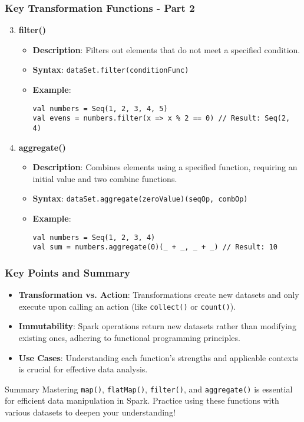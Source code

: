 \documentclass[aspectratio=169]{beamer}
\begin{document}
\begin{frame}[fragile]
    \frametitle{Key Transformation Functions - Part 2}
    \begin{enumerate}
        \setcounter{enumi}{2} %
        \item \textbf{filter()}
        \begin{itemize}
            \item \textbf{Description}: Filters out elements that do not meet a specified condition.
            \item \textbf{Syntax}: \texttt{dataSet.filter(conditionFunc)}
            \item \textbf{Example}:
            \begin{lstlisting}
val numbers = Seq(1, 2, 3, 4, 5)
val evens = numbers.filter(x => x % 2 == 0) // Result: Seq(2, 4)
            \end{lstlisting}
        \end{itemize}

        \item \textbf{aggregate()}
        \begin{itemize}
            \item \textbf{Description}: Combines elements using a specified function, requiring an initial value and two combine functions.
            \item \textbf{Syntax}: \texttt{dataSet.aggregate(zeroValue)(seqOp, combOp)}
            \item \textbf{Example}:
            \begin{lstlisting}
val numbers = Seq(1, 2, 3, 4)
val sum = numbers.aggregate(0)(_ + _, _ + _) // Result: 10
            \end{lstlisting}
        \end{itemize}
    \end{enumerate}
\end{frame}

\begin{frame}
    \frametitle{Key Points and Summary}
    \begin{itemize}
        \item \textbf{Transformation vs. Action}: Transformations create new datasets and only execute upon calling an action (like \texttt{collect()} or \texttt{count()}).
        \item \textbf{Immutability}: Spark operations return new datasets rather than modifying existing ones, adhering to functional programming principles.
        \item \textbf{Use Cases}: Understanding each function's strengths and applicable contexts is crucial for effective data analysis.
    \end{itemize}
    
    \begin{block}{Summary}
        Mastering \texttt{map()}, \texttt{flatMap()}, \texttt{filter()}, and \texttt{aggregate()} is essential for efficient data manipulation in Spark.
        Practice using these functions with various datasets to deepen your understanding!
    \end{block}
\end{frame}
\end{document}
